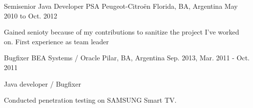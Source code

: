 \begin{cventries}

	\cventry
	{Semisenior Java Developer} %
	{PSA Peugeot-Citroën} %
	{Florida, BA, Argentina} %
	{May 2010 to Oct. 2012} %
	{ %
		\begin{cvitems}
			\item { Gained senioty because of my contributions to sanitize the project I've worked on. }
			      { First experience as team leader }
		\end{cvitems}
	}


	\cventry
	{Bugfixer} %
	{BEA Systems / Oracle} %
	{Pilar, BA, Argentina} %
	{Sep. 2013, Mar. 2011 - Oct. 2011} %
	{ %
		\begin{cvitems}
			\item {Java developer / Bugfixer}
			\item {Conducted penetration testing on SAMSUNG Smart TV.}
		\end{cvitems}
	}


\end{cventries}
